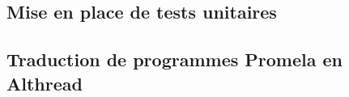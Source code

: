 \subsection{Mise en place de tests unitaires}
\subsection{Traduction de programmes Promela en Althread}